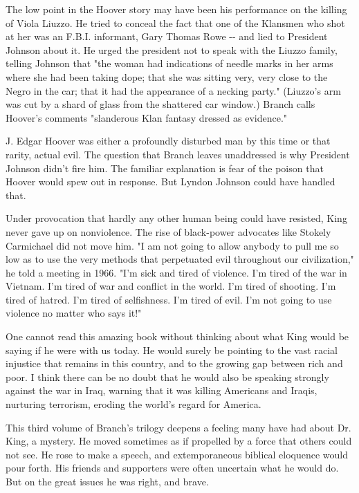 The low point in the Hoover story may have been his performance on the
killing of Viola Liuzzo. He tried to conceal the fact that one of the
Klansmen who shot at her was an F.B.I. informant, Gary Thomas Rowe -\/-
and lied to President Johnson about it. He urged the president not to
speak with the Liuzzo family, telling Johnson that "the woman had
indications of needle marks in her arms where she had been taking dope;
that she was sitting very, very close to the Negro in the car; that it
had the appearance of a necking party." (Liuzzo's arm was cut by a shard
of glass from the shattered car window.) Branch calls Hoover's comments
"slanderous Klan fantasy dressed as evidence."

J. Edgar Hoover was either a profoundly disturbed man by this time or
that rarity, actual evil. The question that Branch leaves unaddressed is
why President Johnson didn't fire him. The familiar explanation is fear
of the poison that Hoover would spew out in response. But Lyndon Johnson
could have handled that.

Under provocation that hardly any other human being could have resisted,
King never gave up on nonviolence. The rise of black-power advocates
like Stokely Carmichael did not move him. "I am not going to allow
anybody to pull me so low as to use the very methods that perpetuated
evil throughout our civilization," he told a meeting in 1966. "I'm sick
and tired of violence. I'm tired of the war in Vietnam. I'm tired of war
and conflict in the world. I'm tired of shooting. I'm tired of hatred.
I'm tired of selfishness. I'm tired of evil. I'm not going to use
violence no matter who says it!"

One cannot read this amazing book without thinking about what King would
be saying if he were with us today. He would surely be pointing to the
vast racial injustice that remains in this country, and to the growing
gap between rich and poor. I think there can be no doubt that he would
also be speaking strongly against the war in Iraq, warning that it was
killing Americans and Iraqis, nurturing terrorism, eroding the world's
regard for America.

This third volume of Branch's trilogy deepens a feeling many have had
about Dr. King, a mystery. He moved sometimes as if propelled by a force
that others could not see. He rose to make a speech, and extemporaneous
biblical eloquence would pour forth. His friends and supporters were
often uncertain what he would do. But on the great issues he was right,
and brave.

